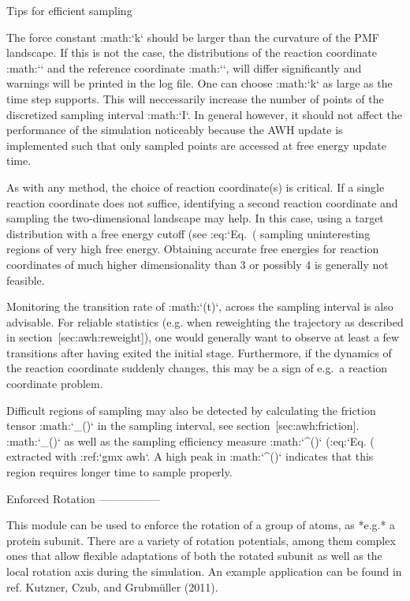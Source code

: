 Tips for efficient sampling
^^^^^^^^^^^^^^^^^^^^^^^^^^^

The force constant :math:`k` should be larger than the curvature of the
PMF landscape. If this is not the case, the distributions of the
reaction coordinate :math:`\xi` and the reference coordinate
:math:`\lambda`, will differ significantly and warnings will be printed
in the log file. One can choose :math:`k` as large as the time step
supports. This will neccessarily increase the number of points of the
discretized sampling interval :math:`I`. In general however, it should
not affect the performance of the simulation noticeably because the AWH
update is implemented such that only sampled points are accessed at free
energy update time.

As with any method, the choice of reaction coordinate(s) is critical. If
a single reaction coordinate does not suffice, identifying a second
reaction coordinate and sampling the two-dimensional landscape may help.
In this case, using a target distribution with a free energy cutoff (see
:eq:`Eq. (%
sampling uninteresting regions of very high free energy. Obtaining
accurate free energies for reaction coordinates of much higher
dimensionality than 3 or possibly 4 is generally not feasible.

Monitoring the transition rate of :math:`\xi(t)`, across the sampling
interval is also advisable. For reliable statistics (e.g. when
reweighting the trajectory as described in section [sec:awh:reweight]),
one would generally want to observe at least a few transitions after
having exited the initial stage. Furthermore, if the dynamics of the
reaction coordinate suddenly changes, this may be a sign of e.g. a
reaction coordinate problem.

Difficult regions of sampling may also be detected by calculating the
friction tensor :math:`\eta_{\mu\nu}(\lambda)` in the sampling interval,
see section [sec:awh:friction]. :math:`\eta_{\mu\nu}(\lambda)` as well
as the sampling efficiency measure :math:`\eta^{}(\lambda)`
(:eq:`Eq. (%
extracted with :ref:`gmx awh`. A high peak in
:math:`\eta^{}(\lambda)` indicates that this region requires
longer time to sample properly.

Enforced Rotation
-----------------

This module can be used to enforce the rotation of a group of atoms, as
*e.g.* a protein subunit. There are a variety of rotation potentials,
among them complex ones that allow flexible adaptations of both the
rotated subunit as well as the local rotation axis during the
simulation. An example application can be found in ref. Kutzner, Czub,
and Grubmüller (2011).

